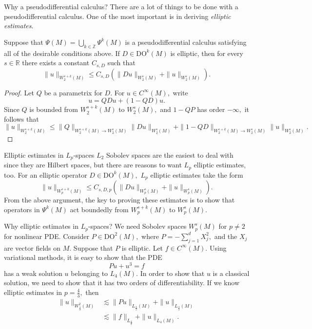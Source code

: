 \documentclass{beamer}
\numberwithin{equation}{section}
\theoremstyle{plain}
\theoremstyle{plain}
\theoremstyle{definition}
\theoremstyle{plain}
\theoremstyle{plain}
\theoremstyle{definition}
\newcommand{\Rl}{\mathbb{R}}
\newcommand{\Itgr}{\mathbb{Z}}
\begin{document}
\begin{frame}{Why a pseudodifferential calculus?}
  There are a lot of things to be done with a pseudodifferential calculus. One of the most important is in deriving \emph{elliptic estimates}.
  \begin{lemma}
    Suppose that $\Psi(M) = \bigcup_{k\in \Itgr} \Psi^k(M)$ is a pseudodifferential calculus satisfying all of the desirable conditions above. If $D\in \mathrm{DO}^k(M)$ is elliptic, then for every $s \in \Rl$ there exists a constant $C_{s,D}$ such that
    \[
      \|u\|_{W^{s+k}_2(M)} \leq C_{s,D}(\|Du\|_{W^s_2(M)} + \|u\|_{W^{s}_2(M)}).
    \]
  \end{lemma}
  \begin{proof}
    Let $Q$ be a parametrix for $D.$ For $u\in C^\infty(M),$ write
    \[
        u = QDu+(1-QD)u.
    \]  
    Since $Q$ is bounded from $W^{s+k}_2(M)$ to $W^{s}_2(M),$ and $1-QP$ has order $-\infty,$ it follows that
    \[
        \|u\|_{W^{s+k}_2(M)} \leq \|Q\|_{W^{s+k}_2(M)\to W^s_2(M)}\|Du\|_{W^s_2(M)}+\|1-QD\|_{W^{s+k}_2(M)\to W^s_2(M)}\|u\|_{W^s_2(M)}.
    \]
  \end{proof}
\end{frame}

\begin{frame}{Elliptic estimates in $L_p$-spaces}
    $L_2$ Sobolev spaces are the easiest to deal with since they are Hilbert spaces, but there are reasons to want $L_p$ elliptic estimates, too. For an elliptic operator $D\in \mathrm{DO}^k(M),$ $L_p$ elliptic estimates take the form
    \[
        \|u\|_{W^{s+k}_p(M)} \leq C_{s,D,p}(\|Du\|_{W^{s}_p(M)}+\|u\|_{W^{s}_p(M)}).
    \]
    \pause
    From the above argument, the key to proving these estimates is to show that operators in $\Psi^k(M)$ act boundedly from $W^{s+k}_p(M)$
    to $W^{s}_p(M).$
\end{frame}

\begin{frame}{Why elliptic estimates in $L_p$-spaces?}
    We need Sobolev spaces $W^s_p(M)$ for $p\neq 2$ for nonlinear PDE. 
    \pause
    Consider $P\in \mathrm{DO}^2(M),$ where $P = -\sum_{j=1}^d X_j^2,$ and the $X_j$ are vector fields on $M.$ Suppose that $P$ is elliptic.
    \pause
    Let $f \in C^\infty(M).$ Using variational methods, it is easy to show that the PDE
    \[
        Pu+u^3 = f
    \]
    has a weak solution $u$ belonging to $L_4(M).$ In order to show that $u$ is a classical solution, we need to show that it has two orders of differentiability.
    \pause
    If we know elliptic estimates in $p=\frac{4}{3},$ then
    \begin{align*}
        \|u\|_{W^2_{\frac{4}{3}}(M)} &\lesssim \|Pu\|_{L_{\frac{4}{3}}(M)}+\|u\|_{L_{\frac{4}{3}}(M)}\\
                                     &\lesssim \|f\|_{L_{\frac{4}{3}}}+\|u\|_{L_4(M)}.
    \end{align*}
\end{frame}
\end{document}
